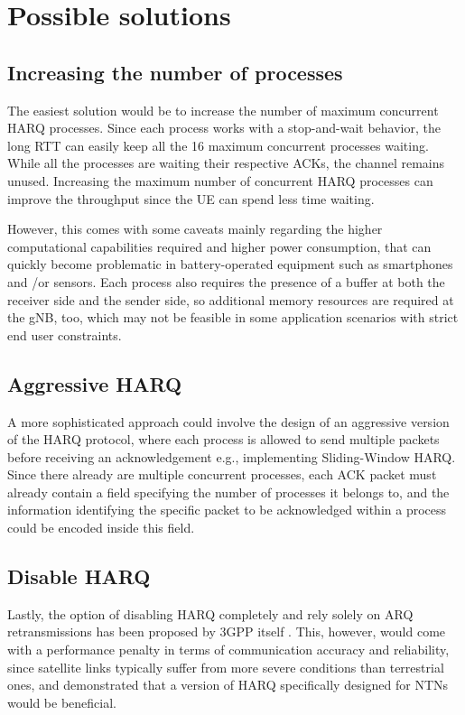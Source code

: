 \section{Possible solutions}
\label{sec:proc-harq-prop-sol}
\subsection{Increasing the number of processes}
The easiest solution would be to increase the number of maximum concurrent \ac{HARQ} processes. Since each process works with a stop-and-wait behavior, the long \ac{RTT} can easily keep all the 16 maximum concurrent processes waiting. While all the processes are waiting their respective \ac{ACK}s, the channel remains unused. Increasing the maximum number of concurrent \ac{HARQ} processes can improve the throughput since the \ac{UE} can spend less time waiting.

However, this comes with some caveats mainly regarding the higher computational capabilities required and higher power consumption, that can quickly become problematic in battery-operated equipment such as smartphones and /or sensors. Each process also requires the presence of a buffer at both the receiver side and the sender side, so additional memory resources are required at the \ac{gNB}, too, which may not be feasible in some application scenarios with strict end user constraints. 
\subsection{Aggressive HARQ}
A more sophisticated approach could involve the design of an aggressive version of the \ac{HARQ} protocol, where each process is allowed to send multiple packets before receiving an acknowledgement e.g., implementing Sliding-Window \ac{HARQ}. Since there already are multiple concurrent processes, each \ac{ACK} packet must already contain a field specifying the number of processes it belongs to, and the information identifying the specific packet to be acknowledged within a process could be encoded inside this field.

\subsection{Disable HARQ}
Lastly, the option of disabling \ac{HARQ} completely and rely solely on \ac{ARQ} retransmissions has been proposed by 3GPP itself \cite{hybrid-arq-schemes-muk}. This, however, would come with a performance penalty in terms of communication accuracy and reliability, since satellite links typically suffer from more severe conditions than terrestrial ones, and \cite{5g-beyond-5g-ntn-trends-vanellicoralli} demonstrated that a version of \ac{HARQ} specifically designed for \ac{NTN}s would be beneficial.

